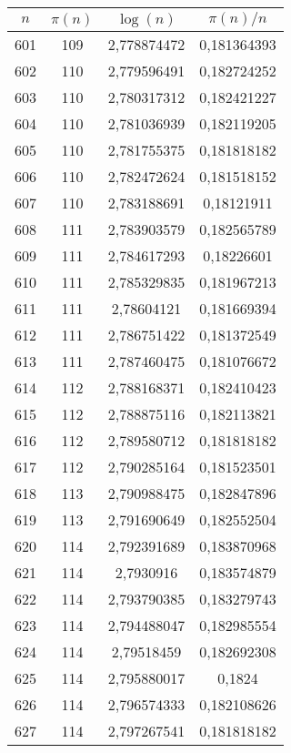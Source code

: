 {\begin{minipage}[!h]{0.45\textwidth}\centering
\tiny
\begin{longtable}{cccc} \hline
\(n\) & \(\pi(n)\) & \(\log(n)\) & \(\pi(n)/n\) \\ \hline
601 & 109 & 2,778874472 & 0,181364393 \\ \hline
602 & 110 & 2,779596491 & 0,182724252 \\ \hline
603 & 110 & 2,780317312 & 0,182421227 \\ \hline
604 & 110 & 2,781036939 & 0,182119205 \\ \hline
605 & 110 & 2,781755375 & 0,181818182 \\ \hline
606 & 110 & 2,782472624 & 0,181518152 \\ \hline
607 & 110 & 2,783188691 & 0,18121911 \\ \hline
608 & 111 & 2,783903579 & 0,182565789 \\ \hline
609 & 111 & 2,784617293 & 0,18226601 \\ \hline
610 & 111 & 2,785329835 & 0,181967213 \\ \hline
611 & 111 & 2,78604121 & 0,181669394 \\ \hline
612 & 111 & 2,786751422 & 0,181372549 \\ \hline
613 & 111 & 2,787460475 & 0,181076672 \\ \hline
614 & 112 & 2,788168371 & 0,182410423 \\ \hline
615 & 112 & 2,788875116 & 0,182113821 \\ \hline
616 & 112 & 2,789580712 & 0,181818182 \\ \hline
617 & 112 & 2,790285164 & 0,181523501 \\ \hline
618 & 113 & 2,790988475 & 0,182847896 \\ \hline
619 & 113 & 2,791690649 & 0,182552504 \\ \hline
620 & 114 & 2,792391689 & 0,183870968 \\ \hline
621 & 114 & 2,7930916 & 0,183574879 \\ \hline
622 & 114 & 2,793790385 & 0,183279743 \\ \hline
623 & 114 & 2,794488047 & 0,182985554 \\ \hline
624 & 114 & 2,79518459 & 0,182692308 \\ \hline
625 & 114 & 2,795880017 & 0,1824 \\ \hline
626 & 114 & 2,796574333 & 0,182108626 \\ \hline
627 & 114 & 2,797267541 & 0,181818182 \\ \hline

\end{longtable}
\end{minipage}}
